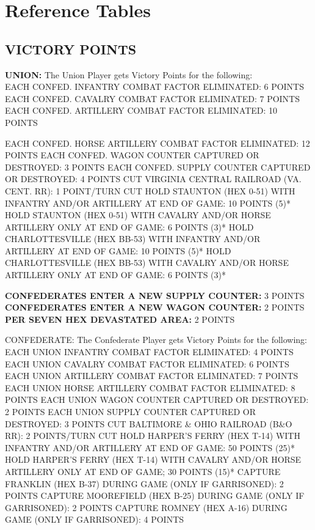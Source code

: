 \section{Reference Tables}

\subsection*{VICTORY POINTS}

\begin{scenariodata}
\textbf{UNION:} The Union Player gets Victory Points for the following:\\
EACH CONFED. INFANTRY COMBAT FACTOR ELIMINATED: 6 POINTS\\
EACH CONFED. CAVALRY COMBAT FACTOR ELIMINATED: 7 POINTS\\
EACH CONFED. ARTILLERY COMBAT FACTOR ELIMINATED: 10 POINTS\\
\end{scenariodata}

EACH CONFED. HORSE ARTILLERY COMBAT FACTOR ELIMINATED: 12 POINTS EACH CONFED. WAGON COUNTER CAPTURED OR DESTROYED: 3 POINTS EACH CONFED. SUPPLY COUNTER CAPTURED OR DESTROYED: 4 POINTS CUT VIRGINIA CENTRAL RAILROAD (VA. CENT. RR): 1 POINT/TURN CUT HOLD STAUNTON (HEX 0-51) WITH INFANTRY AND/OR ARTILLERY AT END OF GAME: 10 POINTS (5)* HOLD STAUNTON (HEX 0-51) WITH CAVALRY AND/OR HORSE ARTILLERY ONLY AT END OF GAME: 6 POINTS (3)* HOLD CHARLOTTESVILLE (HEX BB-53) WITH INFANTRY AND/OR ARTILLERY AT END OF GAME: 10 POINTS (5)* HOLD CHARLOTTESVILLE (HEX BB-53) WITH CAVALRY AND/OR HORSE ARTILLERY ONLY AT END OF GAME: 6 POINTS (3)*

\begin{scenariodata}
\textbf{CONFEDERATES ENTER A NEW SUPPLY COUNTER:} 3 POINTS\\
\textbf{CONFEDERATES ENTER A NEW WAGON COUNTER:} 2 POINTS\\
\textbf{PER SEVEN HEX DEVASTATED AREA:} 2 POINTS\\
\end{scenariodata}

CONFEDERATE: The Confederate Player gets Victory Points for the following: EACH UNION INFANTRY COMBAT FACTOR ELIMINATED: 4 POINTS EACH UNION CAVALRY COMBAT FACTOR ELIMINATED: 6 POINTS EACH UNION ARTILLERY COMBAT FACTOR ELIMINATED: 7 POINTS EACH UNION HORSE ARTILLERY COMBAT FACTOR ELIMINATED: 8 POINTS EACH UNION WAGON COUNTER CAPTURED OR DESTROYED: 2 POINTS EACH UNION SUPPLY COUNTER CAPTURED OR DESTROYED: 3 POINTS CUT BALTIMORE \& OHIO RAILROAD (B\&O RR): 2 POINTS/TURN CUT HOLD HARPER'S FERRY (HEX T-14) WITH INFANTRY AND/OR ARTILLERY AT END OF GAME: 50 POINTS (25)* HOLD HARPER'S FERRY (HEX T-14) WITH CAVALRY AND/OR HORSE ARTILLERY ONLY AT END OF GAME; 30 POINTS (15)* CAPTURE FRANKLIN (HEX B-37) DURING GAME (ONLY IF GARRISONED): 2 POINTS CAPTURE MOOREFIELD (HEX B-25) DURING GAME (ONLY IF GARRISONED): 2 POINTS CAPTURE ROMNEY (HEX A-16) DURING GAME (ONLY IF GARRISONED): 4 POINTS

